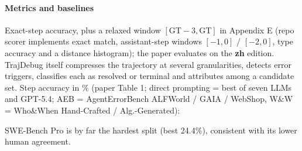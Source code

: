 \paragraph{Metrics and baselines} Exact-step accuracy, plus a relaxed window $[\mathrm{GT}{-}3, \mathrm{GT}]$ in Appendix E (repo scorer  implements exact match, assistant-step windows $[-1, 0]$ / $[-2, 0]$, type accuracy and a distance histogram); the paper evaluates on the \textbf{zh} edition. TrajDebug itself compresses the trajectory at several granularities, detects error triggers, classifies each as resolved or terminal and attributes among a candidate set. Step accuracy in \% (paper Table 1; direct prompting = best of seven LLMs and GPT-5.4; AEB = AgentErrorBench ALFWorld / GAIA / WebShop, W\&W = Who\&When Hand-Crafted / Alg.-Generated):

\begin{center}\footnotesize\setlength{\tabcolsep}{2pt}
\end{center}
SWE-Bench Pro is by far the hardest split (best 24.4\%), consistent with its lower human agreement.

